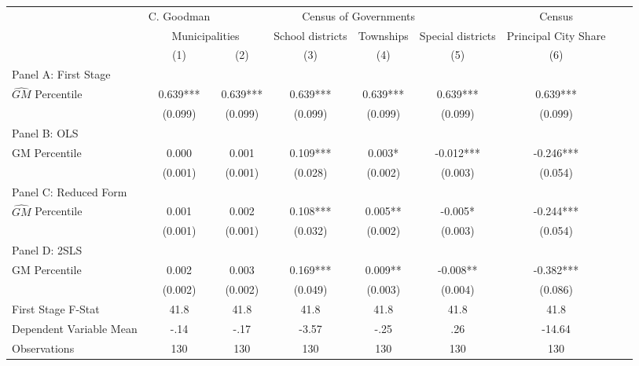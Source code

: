  \begin{tabular}{l*{8}{c}} \toprule
&\multicolumn{1}{c}{C. Goodman}&\multicolumn{4}{c}{Census of Governments}&\multicolumn{1}{c}{Census}\\\cmidrule(lr){2-2}\cmidrule(lr){3-6}\cmidrule(lr){7-7}
&\multicolumn{2}{c}{Municipalities}&\multicolumn{1}{c}{School districts}&\multicolumn{1}{c}{Townships}&\multicolumn{1}{c}{Special districts}&\multicolumn{1}{c}{Principal City Share}\\\cmidrule(lr){2-3}\cmidrule(lr){4-6}\cmidrule(lr){7-7}
&\multicolumn{1}{c}{(1)}&\multicolumn{1}{c}{(2)}&\multicolumn{1}{c}{(3)}&\multicolumn{1}{c}{(4)}&\multicolumn{1}{c}{(5)}&\multicolumn{1}{c}{(6)}\\
\cmidrule(lr){1-7}
\multicolumn{6}{l}{Panel A: First Stage}\\
\cmidrule(lr){1-7}
$\widehat{GM}$ Percentile&    0.639***&    0.639***&    0.639***&    0.639***&    0.639***&    0.639***\\
                &  (0.099)   &  (0.099)   &  (0.099)   &  (0.099)   &  (0.099)   &  (0.099)   \\
\cmidrule(lr){1-7}
\multicolumn{6}{l}{Panel B: OLS}\\
\cmidrule(lr){1-7}
GM Percentile   &    0.000   &    0.001   &    0.109***&    0.003*  &   -0.012***&   -0.246***\\
                &  (0.001)   &  (0.001)   &  (0.028)   &  (0.002)   &  (0.003)   &  (0.054)   \\
\cmidrule(lr){1-7}
\multicolumn{6}{l}{Panel C: Reduced Form}\\
\cmidrule(lr){1-7}
$\widehat{GM}$ Percentile&    0.001   &    0.002   &    0.108***&    0.005** &   -0.005*  &   -0.244***\\
                &  (0.001)   &  (0.001)   &  (0.032)   &  (0.002)   &  (0.003)   &  (0.054)   \\
\cmidrule(lr){1-7}
\multicolumn{6}{l}{Panel D: 2SLS}\\
\cmidrule(lr){1-7}
GM Percentile   &    0.002   &    0.003   &    0.169***&    0.009** &   -0.008** &   -0.382***\\
                &  (0.002)   &  (0.002)   &  (0.049)   &  (0.003)   &  (0.004)   &  (0.086)   \\
\midrule
First Stage F-Stat&     41.8   &     41.8   &     41.8   &     41.8   &     41.8   &     41.8   \\
Dependent Variable Mean&     -.14   &     -.17   &    -3.57   &     -.25   &      .26   &   -14.64   \\
Observations    &      130   &      130   &      130   &      130   &      130   &      130   \\
       \bottomrule \end{tabular}
